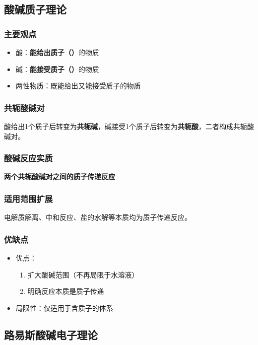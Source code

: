 \subsection{酸碱质子理论}
\subsubsection{主要观点}
\begin{itemize}
    \item 酸：\textbf{能给出质子（）}的物质
    \item 碱：\textbf{能接受质子（）}的物质
    \item 两性物质：既能给出又能接受质子的物质
\end{itemize}

\subsubsection{共轭酸碱对}
酸给出1个质子后转变为\textbf{共轭碱}，碱接受1个质子后转变为\textbf{共轭酸}，二者构成共轭酸碱对。

\subsubsection{酸碱反应实质}
\textbf{两个共轭酸碱对之间的质子传递反应}

\subsubsection{适用范围扩展}
电解质解离、中和反应、盐的水解等本质均为质子传递反应。

\subsubsection{优缺点}
\begin{itemize}
    \item 优点：
    \begin{enumerate}
        \item 扩大酸碱范围（不再局限于水溶液）
        \item 明确反应本质是质子传递
    \end{enumerate}
    \item 局限性：仅适用于含质子的体系
\end{itemize}

\subsection{路易斯酸碱电子理论}

